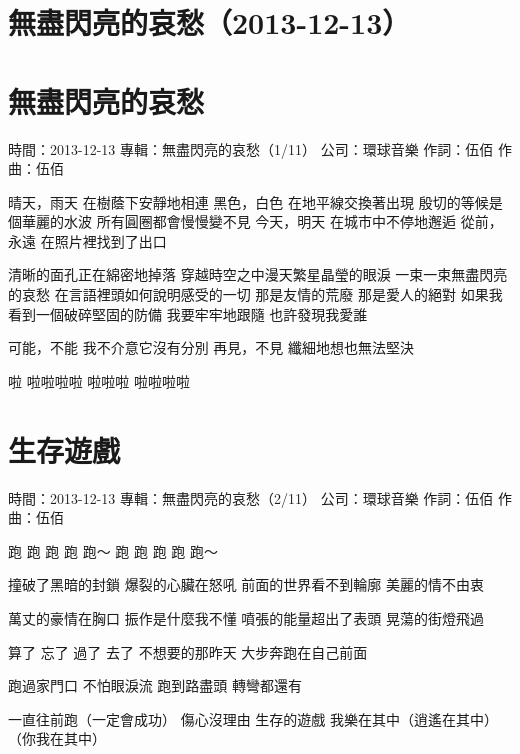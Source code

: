 \documentclass[UTF8,a4paper,oneside,twocolumn,12pt]{ctexbook}
\newcommand{\infopair}[2]{\textbullet #1：#2}
\newcommand{\zc}[1][伍佰]{\infopair{作詞}{#1}}
\newcommand{\zq}[1][伍佰]{\infopair{作曲}{#1}}
\newcommand{\zj}[1]{\infopair{專輯}{#1}}
\newcommand{\sj}[1]{\infopair{時間}{#1}}
\newcommand{\gs}[1]{\infopair{公司}{#1}}
\newenvironment{info}{\begin{flushleft}\kaishu
	}
	{\end{flushleft}\normalsize\yahei\par}
\newenvironment{lyric}{
	}
{}
\begin{document}
\section*{無盡閃亮的哀愁（2013-12-13）}
\section{無盡閃亮的哀愁}
\begin{info}
	\sj{2013-12-13}
	\zj{無盡閃亮的哀愁（1/11）}
	\gs{環球音樂}
	\zc
	\zq
\end{info}
\begin{lyric}
	晴天，雨天  在樹蔭下安靜地相連
	黑色，白色  在地平線交換著出現
	殷切的等候是個華麗的水波   所有圓圈都會慢慢變不見
	今天，明天   在城市中不停地邂逅
	從前，永遠   在照片裡找到了出口

	清晰的面孔正在綿密地掉落
	穿越時空之中漫天繁星晶瑩的眼淚
	一束一束無盡閃亮的哀愁
	在言語裡頭如何說明感受的一切
	那是友情的荒廢
	那是愛人的絕對
	如果我看到一個破碎堅固的防備
	我要牢牢地跟隨
	也許發現我愛誰

	可能，不能
	我不介意它沒有分別
	再見，不見
	纖細地想也無法堅決

	啦 啦啦啦啦 啦啦啦 啦啦啦啦
\end{lyric}

\section{生存遊戲}
\begin{info}
	\sj{2013-12-13}
	\zj{無盡閃亮的哀愁（2/11）}
	\gs{環球音樂}
	\zc
	\zq
\end{info}
\begin{lyric}
	跑 跑 跑 跑 跑～
	跑 跑 跑 跑 跑～

	撞破了黑暗的封鎖
	爆裂的心臟在怒吼
	前面的世界看不到輪廓
	美麗的情不由衷

	萬丈的豪情在胸口
	振作是什麼我不懂
	噴張的能量超出了表頭
	晃蕩的街燈飛過

	算了 忘了 過了 去了 不想要的那昨天
	大步奔跑在自己前面

	跑過家門口 不怕眼淚流
	跑到路盡頭 轉彎都還有

	一直往前跑（一定會成功） 傷心沒理由
	生存的遊戲 我樂在其中（逍遙在其中）（你我在其中）
\end{lyric}
\end{document}
